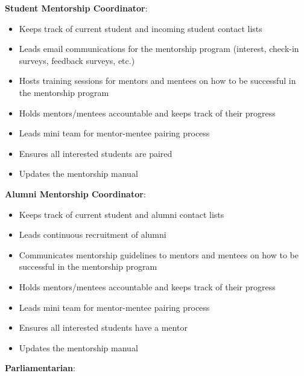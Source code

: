 \documentclass[
]{book}
\providecommand{\tightlist}{%
  \setlength{\itemsep}{0pt}\setlength{\parskip}{0pt}}
\begin{document}
\textbf{Student Mentorship Coordinator}:

\begin{itemize}
\tightlist
\item
  Keeps track of current student and incoming student contact lists
\item
  Leads email communications for the mentorship program (interest, check-in surveys, feedback surveys, etc.)\\
\item
  Hosts training sessions for mentors and mentees on how to be successful in the mentorship program
\item
  Holds mentors/mentees accountable and keeps track of their progress\\
\item
  Leads mini team for mentor-mentee pairing process
\item
  Ensures all interested students are paired\\
\item
  Updates the mentorship manual
\end{itemize}

\textbf{Alumni Mentorship Coordinator}:

\begin{itemize}
\tightlist
\item
  Keeps track of current student and alumni contact lists\\
\item
  Leads continuous recruitment of alumni\\
\item
  Communicates mentorship guidelines to mentors and mentees on how to be successful in the mentorship program\\
\item
  Holds mentors/mentees accountable and keeps track of their progress\\
\item
  Leads mini team for mentor-mentee pairing process\\
\item
  Ensures all interested students have a mentor
\item
  Updates the mentorship manual
\end{itemize}

\textbf{Parliamentarian}:
\end{document}
